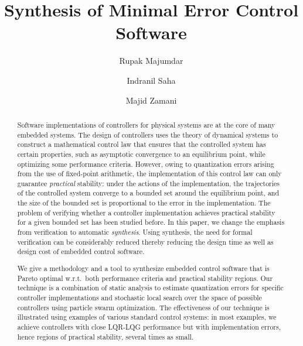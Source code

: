 \documentclass{amsart}
\numberwithin{equation}{section}
\begin{document}
\begin{abstract}
Software implementations of controllers for physical systems are at the core of many embedded systems.
The design of controllers uses the theory of dynamical systems to construct a 
mathematical control law that ensures that the controlled system has certain properties, 
such as asymptotic convergence to an equilibrium point, while optimizing some performance criteria.
However, owing to quantization errors arising from the use of fixed-point arithmetic,
the implementation of this control law can only guarantee
{\em practical} stability: under the actions of the implementation, the trajectories
of the controlled system converge to a bounded set around the equilibrium point, and the
size of the bounded set is proportional to the error in the implementation.
The problem of verifying whether a controller implementation achieves practical stability
for a given bounded set has been studied before.
In this paper, we change the emphasis from verification to automatic {\em synthesis}. 
Using synthesis, the need for formal verification can be considerably reduced thereby reducing 
the design time as well as design cost of embedded control software. 

We give a methodology and a tool to synthesize embedded control 
software that is Pareto optimal
w.r.t.\ both performance criteria and practical stability regions.
Our technique is a combination of static analysis to estimate quantization 
errors for specific controller implementations
and stochastic local search over the space of possible controllers using particle swarm optimization.
The effectiveness of our technique is illustrated using examples of
various standard control systems: 
in most examples, we achieve controllers with close
LQR-LQG performance but with implementation errors, hence regions of practical stability, 
several times as small.
\end{abstract}


\title[Synthesis of Minimal Error Control Software]{Synthesis of Minimal Error Control Software}


\author[Rupak Majumdar]{Rupak Majumdar} 
\author[Indranil Saha]{Indranil Saha} 
\author[Majid Zamani]{Majid Zamani}
\address{Max Planck Institute for Software Systems\\
Kaiserslautern, Germany}
\address{Department of Computer Science\\
University of California at Los Angeles,
Los Angeles, CA 90095}
\address{Department of Electrical Engineering\\
University of California at Los Angeles,
Los Angeles, CA 90095}
\end{document}
